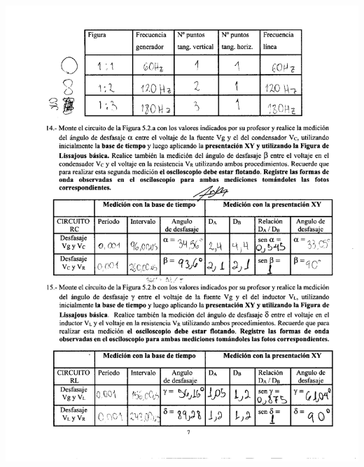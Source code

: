 \documentclass[12pt]{article}
\begin{document}
	\begin{center}
		\includegraphics[width=16cm,height=20cm]{Img/anexo_0005}
	\end{center}
	
\end{document}

